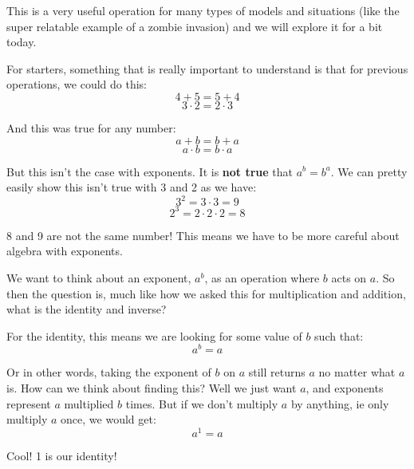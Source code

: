 \documentclass{article}
\begin{document}
This is a very useful operation for many types of models and situations (like the super relatable example of a zombie invasion)
and we will explore it for a bit today. 

For starters, something that is really important to understand is that for previous operations, we could do this: 
\[ 4 + 5 = 5 + 4 \]
\[ 3 \cdot 2 = 2 \cdot 3 \]

And this was true for any number: 
\[ a + b = b + a \]
\[ a \cdot b = b \cdot a\]

But this isn't the case with exponents. It is \textbf{not true} that $a^b = b^a$. We can pretty easily show this isn't true with 3 and 2 as we have: 
\[ 3^2 = 3 \cdot 3 = 9 \]
\[ 2^3 = 2 \cdot 2 \cdot 2 = 8 \]

8 and 9 are not the same number! This means we have to be more careful about algebra with exponents. 

We want to think about an exponent, $a^b$, as an operation where $b$ acts on $a$. So then the question is, much like how we asked this for multiplication and addition, what is the identity and inverse? 

For the identity, this means we are looking for some value of $b$ such that: 
\[ a^b = a \]

Or in other words, taking the exponent of $b$ on $a$ still returns $a$ no matter what $a$ is. 
How can we think about finding this? Well we just want $a$, and exponents represent $a$ multiplied $b$ times. But if we don't multiply $a$ by anything, ie only multiply $a$ once, we would get: 
\[ a^1 = a \] 

Cool! 1 is our identity! 
\end{document}
